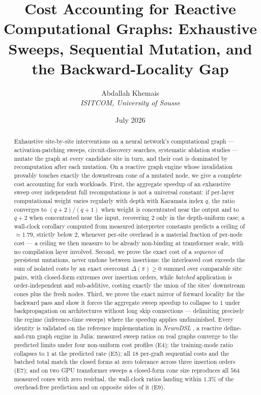 \documentclass[11pt,a4paper]{article}
\begin{document}
\title{Cost Accounting for Reactive Computational Graphs: Exhaustive Sweeps, Sequential Mutation, and the Backward-Locality Gap}
\author{Abdallah Khemais \\ \textit{ISITCOM, University of Sousse}}
\date{July 2026}

\maketitle

\begin{abstract}
Exhaustive site-by-site interventions on a neural network's computational graph --- activation-patching sweeps, circuit-discovery searches, systematic ablation studies --- mutate the graph at every candidate site in turn, and their cost is dominated by recomputation after each mutation. On a reactive graph engine whose invalidation provably touches exactly the downstream cone of a mutated node, we give a complete cost accounting for such workloads. First, the aggregate speedup of an exhaustive sweep over independent full recomputations is not a universal constant: if per-layer computational weight varies regularly with depth with Karamata index $q$, the ratio converges to $(q+2)/(q+1)$ when weight is concentrated near the output and to $q+2$ when concentrated near the input, recovering $2$ only in the depth-uniform case; a wall-clock corollary computed from measured interpreter constants predicts a ceiling of $\approx 1.79$, strictly below $2$, whenever per-site overhead is a material fraction of per-node cost --- a ceiling we then measure to be already non-binding at transformer scale, with no compilation layer involved. Second, we prove the exact cost of a \emph{sequence} of persistent mutations, never undone between insertions: the interleaved cost exceeds the sum of isolated costs by an exact overcount $\Delta(\pi) \ge 0$ summed over comparable site pairs, with closed-form extremes over insertion orders, while \emph{batched} application is order-independent and sub-additive, costing exactly the union of the sites' downstream cones plus the fresh nodes. Third, we prove the exact mirror of forward locality for the backward pass and show it forces the aggregate sweep speedup to collapse to $1$ under backpropagation on architectures without long skip connections --- delimiting precisely the regime (inference-time sweeps) where the speedup applies undiminished. Every identity is validated on the reference implementation in \emph{NeuroDSL} \cite{neurodsl}, a reactive define-and-run graph engine in Julia: measured sweep ratios on real graphs converge to the predicted limits under four non-uniform cost profiles (E4); the training-mode ratio collapses to $1$ at the predicted rate (E5); all $18$ per-graft sequential costs and the batched total match the closed forms at zero tolerance across three insertion orders (E7); and on two GPU transformer sweeps a closed-form cone size reproduces all $564$ measured cones with zero residual, the wall-clock ratios landing within $1.3\%$ of the overhead-free prediction and on opposite sides of it (E9).
\end{abstract}
\end{document}

